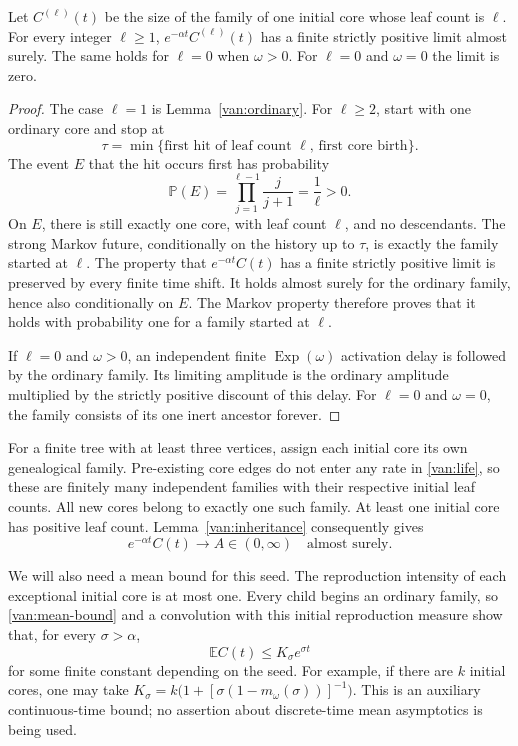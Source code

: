 \begin{lemma}
\label{van:inheritance}
Let $C^{(\ell)}(t)$ be the size of the family of one initial core
whose leaf count is $\ell$.  For every integer $\ell\ge1$,
$e^{-\alpha t}C^{(\ell)}(t)$ has a finite strictly positive limit
almost surely.  The same holds for $\ell=0$ when $\omega>0$.
For $\ell=0$ and $\omega=0$ the limit is zero.
\end{lemma}

\begin{proof}
The case $\ell=1$ is Lemma~\ref{van:ordinary}.
For $\ell\ge2$, start with one ordinary core and stop at
\[
 \tau=\min\{\text{first hit of leaf count }\ell,\,
                  \text{first core birth}\}.
\]
The event $E$ that the hit occurs first has probability
\[
 \mathbb P(E)=\prod_{j=1}^{\ell-1}\frac{j}{j+1}=\frac1\ell>0.
\]
On $E$, there is still exactly one core, with leaf count $\ell$,
and no descendants.  The strong Markov future, conditionally on
the history up to $\tau$, is exactly the family started at $\ell$.
The property that $e^{-\alpha t}C(t)$ has a finite strictly positive
limit is preserved by every finite time shift.  It holds almost surely
for the ordinary family, hence also conditionally on $E$.
The Markov property therefore proves that it holds with probability
one for a family started at $\ell$.

If $\ell=0$ and $\omega>0$, an independent finite
$\operatorname{Exp}(\omega)$ activation delay is followed by the
ordinary family.  Its limiting amplitude is the ordinary amplitude
multiplied by the strictly positive discount of this delay.
For $\ell=0$ and $\omega=0$, the family consists of its one inert
ancestor forever.
\end{proof}

For a finite tree with at least three vertices, assign each initial
core its own genealogical family.  Pre-existing core edges do not enter
any rate in \eqref{van:life}, so these are finitely many independent
families with their respective initial leaf counts.  All new cores
belong to exactly one such family.  At least one initial core has
positive leaf count.  Lemma~\ref{van:inheritance} consequently gives
\begin{equation}
 e^{-\alpha t}C(t)\longrightarrow A\in(0,\infty)
 \quad\text{almost surely}.
 \label{van:seed-amplitude}
\end{equation}

We will also need a mean bound for this seed.  The reproduction
intensity of each exceptional initial core is at most one.
Every child begins an ordinary family, so \eqref{van:mean-bound}
and a convolution with this initial reproduction measure show that,
for every $\sigma>\alpha$,
\begin{equation}
 \mathbb E C(t)\le K_\sigma e^{\sigma t}
 \label{van:seed-mean}
\end{equation}
for some finite constant depending on the seed.  For example, if
there are $k$ initial cores, one may take
$K_\sigma=k\bigl(1+[\sigma(1-m_\omega(\sigma))]^{-1}\bigr)$.
This is an auxiliary continuous-time bound; no assertion about
discrete-time mean asymptotics is being used.

